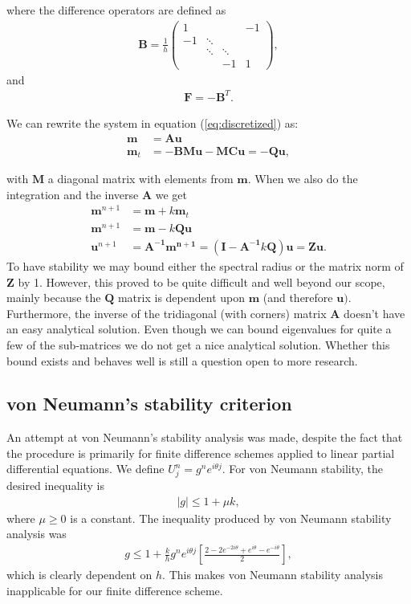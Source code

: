 where the difference operators are defined as
\begin{align*}
\bm{B} = \frac{1}{h}
\begin{pmatrix}
   1 &           &        & -1  \\
  -1 & \ddots    &        &     \\
     & \ddots    & \ddots &	    \\
     &           &     -1 &  1
 \end{pmatrix},
\end{align*}
and 
\begin{align*}
\bm{F} = -\bm{B}^T.
\end{align*}

We can rewrite the system in equation (\ref{eq:discretized}) as:
\begin{align*}
\bm{m} &= \bm{Au} \\
\bm{m}_t &= -\bm{BMu} - \bm{MCu} = \bm{-Qu},
\end{align*}

with $\bm{M}$ a diagonal matrix with elements from $\bm{m}$. When we also do the integration and the inverse $\bm{A}$ we get
\begin{align*}
\bm{m}^{n+1} &= \bm{m} + k\bm{m}_t \\
\bm{m}^{n+1} &= \bm{m} - k\bm{Qu} \\
\bm{u}^{n+1} &= \bm{A^{-1}m^{n+1}} = \left(\bm{I} -\bm{A^{-1}}k\bm{Q}\right)\bm{u} = \bm{Zu}.
\end{align*}
To have stability we may bound either the spectral radius or the matrix norm of $\bm{Z}$ by 1. However, this proved to be quite difficult and well beyond our scope, mainly because the $\bm{Q}$ matrix is dependent upon $\bm{m}$ (and therefore $\bm{u})$. Furthermore, the inverse of the tridiagonal (with corners) matrix $\bm{A}$ doesn't have an easy analytical solution. Even though we can bound eigenvalues for quite a few of the sub-matrices we do not get a nice analytical solution. Whether this bound exists and behaves well is still a question open to more research.

\subsection*{von Neumann's stability criterion}
An attempt at von Neumann's stability analysis was made, despite the fact that the procedure is primarily for finite difference schemes applied to linear partial differential equations. We define $U_{j}^{n} = g^{n}e^{i\theta j}$. For von Neumann stability, the desired inequality is
\begin{align}
|g| \leq 1 + \mu k,
\end{align}
where $\mu \geq 0$ is a constant. 
The inequality produced by von Neumann stability analysis was
\begin{align}
g \leq 1+ \frac{k}{h} g^{n}e^{i\theta j}\left[\frac{2-2e^{-2i\theta}+ e^{i\theta} - e^{-i\theta}}{2}\right],
\end{align}
which is clearly dependent on $h$. This makes von Neumann stability analysis inapplicable for our finite difference scheme.


